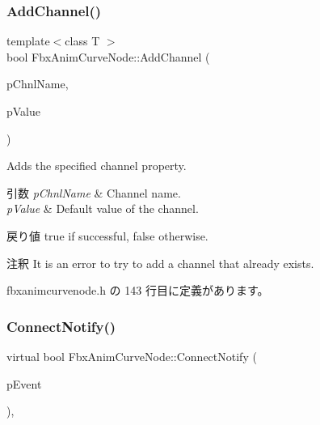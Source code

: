 \subsubsection{\texorpdfstring{Add\+Channel()}{AddChannel()}}
{\footnotesize\ttfamily template$<$class T $>$ \\
bool Fbx\+Anim\+Curve\+Node\+::\+Add\+Channel (\begin{DoxyParamCaption}\item[{const char $\ast$}]{p\+Chnl\+Name,  }\item[{T const \&}]{p\+Value }\end{DoxyParamCaption})\hspace{0.3cm}{\ttfamily [inline]}}

Adds the specified channel property. 
\begin{DoxyParams}{引数}
{\em p\+Chnl\+Name} & Channel name. \\
\hline
{\em p\+Value} & Default value of the channel. \\
\hline
\end{DoxyParams}
\begin{DoxyReturn}{戻り値}
{\ttfamily true} if successful, {\ttfamily false} otherwise. 
\end{DoxyReturn}
\begin{DoxyRemark}{注釈}
It is an error to try to add a channel that already exists. 
\end{DoxyRemark}


 fbxanimcurvenode.\+h の 143 行目に定義があります。

\mbox{\label{class_fbx_anim_curve_node_a0a3743b600796ab2b87dea299654b98c}} 
\subsubsection{\texorpdfstring{Connect\+Notify()}{ConnectNotify()}}
{\footnotesize\ttfamily virtual bool Fbx\+Anim\+Curve\+Node\+::\+Connect\+Notify (\begin{DoxyParamCaption}\item[{const \hyperlink{class_fbx_connect_event}{Fbx\+Connect\+Event} \&}]{p\+Event }\end{DoxyParamCaption})\hspace{0.3cm}{\ttfamily [protected]}, {\ttfamily [virtual]}}



